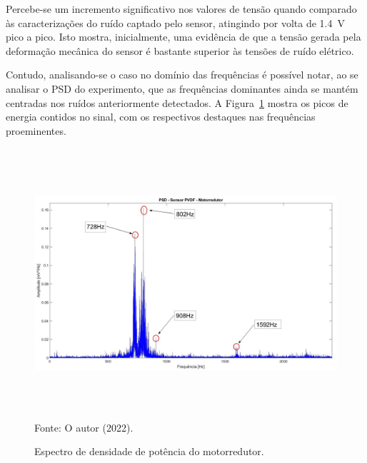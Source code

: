\documentclass[
	12pt,				
	oneside,			
	a4paper,			
	english,			
	brazil,			
	]{abntex2ppgsi}
\begin{document}
{{{{{{{Percebe-se um incremento significativo nos valores de tensão quando comparado às caracterizações do ruído captado pelo sensor, atingindo por volta de {\SI{1,4}{\volt}} pico a pico. Isto mostra, inicialmente, uma evidência de que a tensão gerada pela deformação mecânica do sensor é bastante superior às tensões de ruído elétrico. 

Contudo, analisando-se o caso no domínio das frequências é possível notar, ao se analisar o PSD do experimento, que as frequências dominantes ainda se mantém centradas nos ruídos anteriormente detectados. A Figura~\ref{PSD_MOTORREDUTOR} mostra os picos de energia contidos no sinal, com os respectivos destaques nas frequências proeminentes.

\begin{figure}[H]
\centering
\caption {Espectro de densidade de potência do motorredutor.}
\includegraphics[width=\textwidth,height=100mm,keepaspectratio]{PSD_PVDF_MOTORREDUTOR} \\
Fonte: O autor (2022).
\label{PSD_MOTORREDUTOR}
\end{figure}



}}}}}}}
\end{document}
